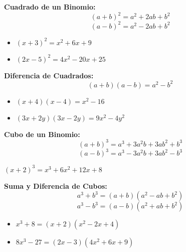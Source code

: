
\begin{theorem}
\textbf{Cuadrado de un Binomio:}
$$(a + b)^2 = a^2 + 2ab + b^2$$
$$(a - b)^2 = a^2 - 2ab + b^2$$
\end{theorem}

\begin{example}
\begin{itemize}
\item $(x + 3)^2 = x^2 + 6x + 9$
\item $(2x - 5)^2 = 4x^2 - 20x + 25$
\end{itemize}
\end{example}

\begin{theorem}
\textbf{Diferencia de Cuadrados:}
$$(a + b)(a - b) = a^2 - b^2$$
\end{theorem}

\begin{example}
\begin{itemize}
\item $(x + 4)(x - 4) = x^2 - 16$
\item $(3x + 2y)(3x - 2y) = 9x^2 - 4y^2$
\end{itemize}
\end{example}

\begin{theorem}
\textbf{Cubo de un Binomio:}
$$(a + b)^3 = a^3 + 3a^2b + 3ab^2 + b^3$$
$$(a - b)^3 = a^3 - 3a^2b + 3ab^2 - b^3$$
\end{theorem}

\begin{example}
$(x + 2)^3 = x^3 + 6x^2 + 12x + 8$
\end{example}

\begin{theorem}
\textbf{Suma y Diferencia de Cubos:}
$$a^3 + b^3 = (a + b)(a^2 - ab + b^2)$$
$$a^3 - b^3 = (a - b)(a^2 + ab + b^2)$$
\end{theorem}

\begin{example}
\begin{itemize}
\item $x^3 + 8 = (x + 2)(x^2 - 2x + 4)$
\item $8x^3 - 27 = (2x - 3)(4x^2 + 6x + 9)$
\end{itemize}
\end{example}

